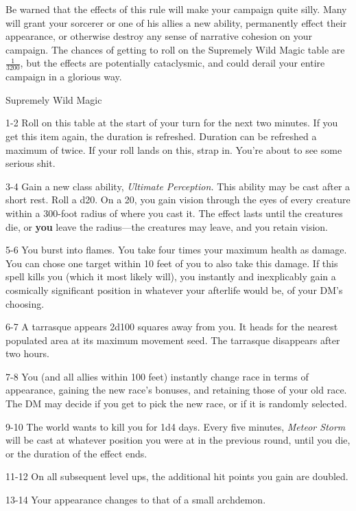 Be warned that the effects of this rule will make your campaign quite silly.
Many will grant your sorcerer or one of his allies a new ability, permanently effect their appearance, or otherwise destroy any sense of narrative cohesion on your campaign.
The chances of getting to roll on the Supremely Wild Magic table are $ \frac{1}{3200} $, but the effects are potentially cataclysmic, and could derail your entire campaign in a glorious way.

\begin{rolltable}[0.9\textheight/0pt]{Supremely Wild Magic}
\item[1-2] Roll on this table at the start of your turn for the next two minutes.
If you get this item again, the duration is refreshed.
Duration can be refreshed a maximum of twice.
If your roll lands on this, strap in.
You're about to see some serious shit.
\item[3-4] Gain a new class ability, \textit{Ultimate Perception.}
This ability may be cast after a short rest.
Roll a d20.
On a 20, you gain vision through the eyes of every creature within a 300-foot radius of where you cast it.
The effect lasts until the creatures die, or \textbf{you} leave the radius---the creatures may leave, and you retain vision.
\item[5-6] You burst into flames. You take four times your maximum health as damage.
You can chose one target within 10 feet of you to also take this damage.
If this spell kills you (which it most likely will), you instantly and inexplicably gain a cosmically significant position in whatever your afterlife would be, of your DM's choosing.
\item[6-7] A tarrasque appears 2d100 squares away from you. 
It heads for the nearest populated area at its maximum movement seed. 
The tarrasque disappears after two hours.
\item[7-8] You (and all allies within 100 feet) instantly change race in terms of appearance, gaining the new race's bonuses, and retaining those of your old race.
The DM may decide if you get to pick the new race, or if it is randomly selected.
\item[9-10] The world wants to kill you for 1d4 days.
Every five minutes, \textit{Meteor Storm} will be cast at whatever position you were at in the previous round, until you die, or the duration of the effect ends.
\item[11-12] On all subsequent level ups, the additional hit points you gain are doubled.
\item[13-14] Your appearance changes to that of a small archdemon.

\end{rolltable}
